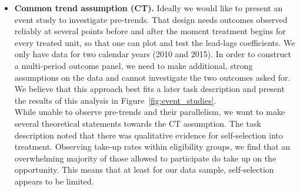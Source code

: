 \documentclass{scrartcl}
\begin{document}
\begin{itemize}[label=$\blacktriangleright$]
    \item \textbf{Common trend assumption (CT).} Ideally we would like to present an event study to investigate pre-trends. That design needs outcomes observed reliably at several points before and after the moment treatment begins for every treated unit, so that one can plot and test the lead-lags coefficients. We only have data for two calendar years (2010 and 2015). In order to construct a multi-period outcome panel, we need to make additional, strong assumptions on the data and cannot investigate the two outcomes asked for. We believe that this approach best fits a later task description and present the results of this analysis in Figure~\ref{fig:event_studies}. \\
    
    While unable to observe pre-trends and their parallelism, we want to make several theoretical statements towards the CT assumption. The task description noted that there was qualitative evidence for self-selection into treatment. Observing take-up rates within eligibility groups, we find that an overwhelming majority of those allowed to participate do take up on the opportunity. This means that at least for our data sample, self-selection appears to be limited. 
    

\end{itemize}
\end{document}
